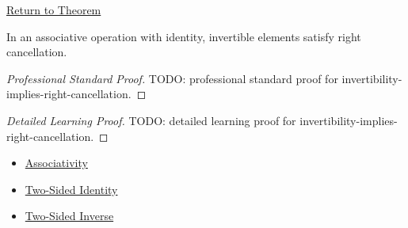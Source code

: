 \newpage
{}
\label{prf:invertibility-implies-right-cancellation}

\begin{remark*}[Return]
\hyperref[prop:invertibility-implies-right-cancellation]{Return to Theorem}
\end{remark*}

\begin{proposition*}
In an associative operation with identity, invertible elements satisfy right
cancellation.
\end{proposition*}

\begin{proof}[Professional Standard Proof]
\LRAProofBodyStart
TODO: professional standard proof for invertibility-implies-right-cancellation.
\end{proof}

\begin{proof}[Detailed Learning Proof]
\LRAProofBodyStart
TODO: detailed learning proof for invertibility-implies-right-cancellation.
\end{proof}

\begin{remark*}
\end{remark*}

\begin{dependencies}
\begin{itemize}
  \item \hyperref[def:associativity]{Associativity}
  \item \hyperref[def:two-sided-identity]{Two-Sided Identity}
  \item \hyperref[def:two-sided-inverse]{Two-Sided Inverse}
\end{itemize}
\end{dependencies}

\clearpage
